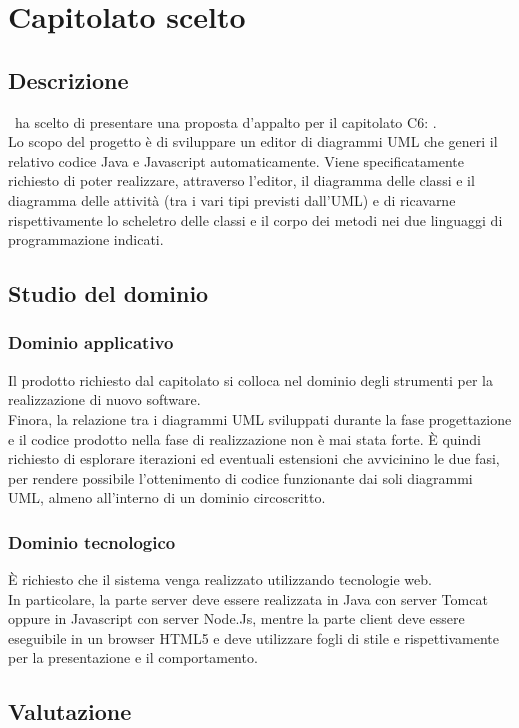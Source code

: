 \documentclass[../StudioDiFattibilita.tex]{subfiles}
\begin{document}
	\section{Capitolato scelto}
		\subsection{Descrizione}
			\kaleidoscode\ ha scelto di presentare una proposta d'appalto per il capitolato C6: \progetto.\\
			Lo scopo del progetto è di sviluppare un editor di diagrammi UML che generi il relativo codice Java e
			Javascript automaticamente.
			Viene specificatamente richiesto di poter realizzare, attraverso l'editor, il diagramma delle classi
			e il diagramma delle attività (tra i vari tipi previsti dall'UML) e di ricavarne rispettivamente lo
			scheletro delle classi e il corpo dei metodi nei due linguaggi di programmazione indicati.
		\subsection{Studio del dominio}
			\subsubsection{Dominio applicativo}
				Il prodotto richiesto dal capitolato si colloca nel dominio degli strumenti per la realizzazione
				di nuovo software.\\
				Finora, la relazione tra i diagrammi UML sviluppati durante la fase progettazione e il codice
				prodotto nella fase di realizzazione non è mai stata forte.
				È quindi richiesto di esplorare iterazioni ed eventuali estensioni che avvicinino le due fasi,
				per rendere possibile l'ottenimento di codice funzionante dai soli diagrammi UML, almeno
				all'interno di un dominio circoscritto.
			\subsubsection{Dominio tecnologico}
				È richiesto che il sistema venga realizzato utilizzando tecnologie web.\\
				In particolare, la parte server deve essere realizzata in Java con server Tomcat oppure in
				Javascript con server Node.Js, mentre la parte client deve essere eseguibile in un browser
				HTML5 e deve utilizzare fogli di stile  e  rispettivamente per la presentazione e il comportamento.
		\subsection{Valutazione}
\end{document}
